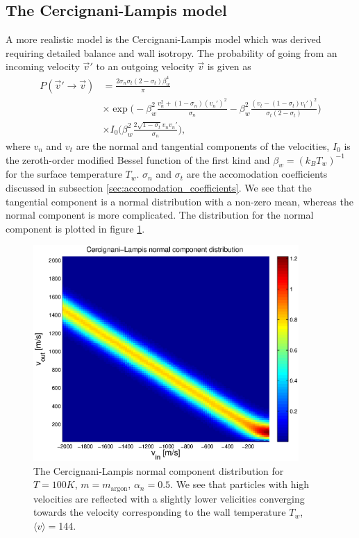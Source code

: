 \subsection{The Cercignani-Lampis model}
A more realistic model is the Cercignani-Lampis model which was derived requiring detailed balance and wall isotropy\cite{cowling1974cercignani}. The probability of going from an incoming velocity $\vec v'$ to an outgoing velocity $\vec v$ is given as
\begin{align}
	\nonumber
	P(\vec v'\rightarrow \vec v) &= \frac{2\sigma_n\sigma_t(2-\sigma_t)\beta_w^4}{\pi}\\
	\nonumber
	&\times\exp\Big(-\beta_w^2\frac{v_n^2 + (1-\sigma_n)(v_n')^2}{\sigma_n} - \beta_w^2\frac{(v_t - (1 - \sigma_t)v_t')^2}{\sigma_t(2 - \sigma_t)}\Big)\\
	&\times I_0\Big(\beta_w^2\frac{2\sqrt{1 - \sigma_t}v_nv_n'}{\sigma_n}\Big),
\end{align}
where $v_n$ and $v_t$ are the normal and tangential components of the velocities, $I_0$ is the zeroth-order modified Bessel function of the first kind and $\beta_w = (k_BT_w)^{-1}$ for the surface temperature $T_w$. $\sigma_n$ and $\sigma_t$ are the accomodation coefficients discussed in subsection \ref{sec:accomodation_coefficients}. We see that the tangential component is a normal distribution with a non-zero mean, whereas the normal component is more complicated. The distribution for the normal component is plotted in figure \ref{fig:cercignani_lampis}.
\begin{figure}[h]
\begin{center}
\includegraphics[width=0.9\textwidth, trim=0cm 0cm 0cm 0cm, clip]{DSMC/figures/cercignani-lampis.eps}
\end{center}
\caption{The Cercignani-Lampis normal component distribution for $T=100K$, $m=m_{\text{argon}}$, $\alpha_n=0.5$. We see that particles with high velocities are reflected with a slightly lower velicities converging towards the velocity corresponding to the wall temperature $T_w$, $\langle v \rangle = $\unit{144}{\meter\per\second}.}
\label{fig:cercignani_lampis}
\end{figure}
